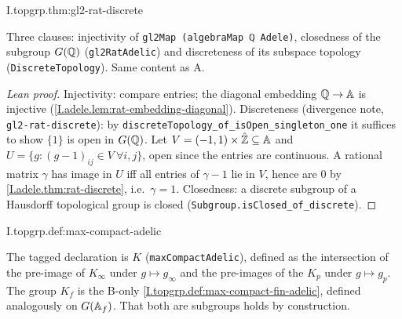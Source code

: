 \begin{theorem}[$G(\Q)$ is discrete]
\end{theorem}
\begin{tfformal}{I.topgrp.thm:gl2-rat-discrete}
\begin{tffidelity}
Three clauses: injectivity of \texttt{gl2Map (algebraMap ℚ Adele)}, closedness of the subgroup $G(\Q)$ (\texttt{gl2RatAdelic}) and discreteness of its subspace topology (\texttt{DiscreteTopology}). Same content as A.
\end{tffidelity}
\end{tfformal}
\begin{proof}[Lean proof]
Injectivity: compare entries; the diagonal embedding $\mathbb{Q}\to\mathbb{A}$ is injective (\cref{I.adele.lem:rat-embedding-diagonal}). Discreteness (divergence note, \texttt{gl2-rat-discrete}): by \texttt{discreteTopology\_of\_isOpen\_singleton\_one} it suffices to show $\{1\}$ is open in $G(\Q)$. Let $V=(-1,1)\times\hat{\mathbb{Z}}\subseteq\mathbb{A}$ and $U=\{g:(g-1)_{ij}\in V\ \forall i,j\}$, open since the entries are continuous. A rational matrix $\gamma$ has image in $U$ iff all entries of $\gamma-1$ lie in $V$, hence are $0$ by \cref{I.adele.thm:rat-discrete}, i.e.\ $\gamma=1$. Closedness: a discrete subgroup of a Hausdorff topological group is closed (\texttt{Subgroup.isClosed\_of\_discrete}).
\end{proof}

\begin{definition}
\end{definition}
\begin{tfformal}{I.topgrp.def:max-compact-adelic}
\begin{tffidelity}
The tagged declaration is $K$ (\texttt{maxCompactAdelic}), defined as the intersection of the pre-image of $K_\infty$ under $g\mapsto g_\infty$ and the pre-images of the $K_p$ under $g\mapsto g_p$. The group $K_f$ is the B-only \cref{I.topgrp.def:max-compact-fin-adelic}, defined analogously on $G(\mathbb{A}_f)$. That both are subgroups holds by construction.
\end{tffidelity}
\end{tfformal}

